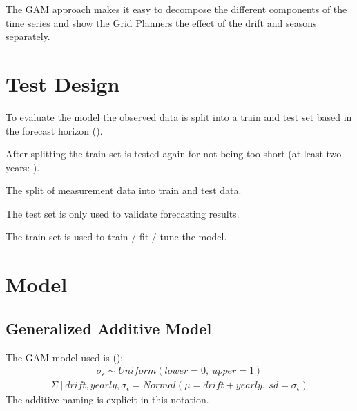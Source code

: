 \documentclass[letterpaper,10pt,english]{sphinxmanual}
\let\sphinxpxdimen\pdfpxdimen\else\newdimen\sphinxpxdimen
\begin{document}
The GAM approach makes it easy to decompose the different components of the time series and show the Grid Planners the effect of the drift and seasons separately.


\section{Test Design}
\label{\detokenize{modeling:test-design}}
To evaluate the model the observed data is split into a train and test set based in the forecast horizon ({\hyperref[\detokenize{autoapi/src/preprocess/preprocess/index:src.preprocess.preprocess.split_last}]{}}).

After splitting the train set is tested again for not being too short (at least two years: {\hyperref[\detokenize{autoapi/src/preprocess/preprocess/index:src.preprocess.preprocess.too_short}]{}}).
\begin{quote}

\noindent{\hspace*{\fill}\sphinxincludegraphics[width=600\sphinxpxdimen]{{train_test}.png}\hspace*{\fill}}
\end{quote}

The split of measurement data into train and test data.

The test set is only used to validate forecasting results.

The train set is used to train / fit / tune the model.


\section{Model}
\label{\detokenize{modeling:model}}

\subsection{Generalized Additive Model}
\label{\detokenize{modeling:generalized-additive-model}}
The GAM model used is ({\hyperref[\detokenize{autoapi/src/model/model/index:src.model.model.create_model}]{}}):
\begin{equation*}
\begin{split}\sigma_\epsilon \sim Uniform(lower=0, \:upper=1)\end{split}
\end{equation*}\begin{equation*}
\begin{split}\Sigma\:|\:drift, yearly, \sigma_\epsilon = Normal(\mu=drift + yearly, \:sd=\sigma_\epsilon)\end{split}
\end{equation*}
The additive naming is explicit in this notation.
\end{document}
